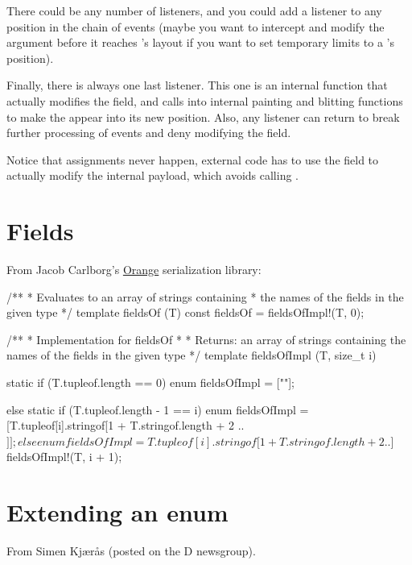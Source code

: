 There could be any number of listeners, and you could add a listener to any position in the chain of events (maybe you want to intercept and modify the argument before it reaches 's layout if you want to set temporary limits to a 's position).

Finally, there is always one last listener. This one is an internal function that actually modifies the  field, and calls into internal painting and blitting functions to make the  appear into its new position. Also, any listener can return  to break further processing of events and deny modifying the field.

Notice that assignments never happen, external code has to use the  field to actually modify the internal payload, which avoids calling .

\section{Fields}

From Jacob Carlborg's \href{https://github.com/jacob-carlborg/orange}{Orange} serialization library:

\begin{dcode}
/**
 * Evaluates to an array of strings containing 
 * the names of the fields in the given type
 */
template fieldsOf (T)
{
	const fieldsOf = fieldsOfImpl!(T, 0);
}

/**
 * Implementation for fieldsOf
 * 
 * Returns: an array of strings containing the names of the fields in the given type
 */
template fieldsOfImpl (T, size_t i)
{
    static if (T.tupleof.length == 0)
        enum fieldsOfImpl = [""];

    else static if (T.tupleof.length - 1 == i)
        enum fieldsOfImpl = [T.tupleof[i].stringof[1 + T.stringof.length + 2 .. $]];

    else
        enum fieldsOfImpl = T.tupleof[i].stringof[1 + T.stringof.length + 2 .. $] ~ fieldsOfImpl!(T, i + 1);
}
\end{dcode}

\section{Extending an enum}

From Simen Kj\ae r\r{a}s (posted on the D newsgroup).

